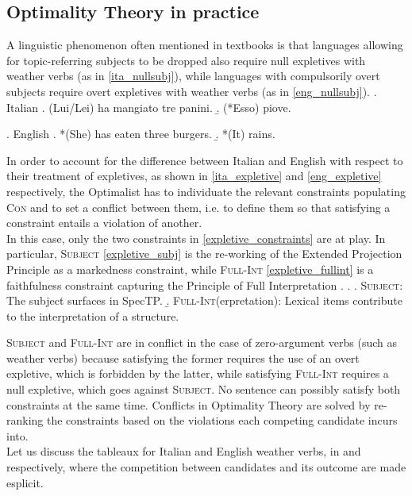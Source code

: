 \subsection{Optimality Theory in practice} A linguistic phenomenon often mentioned in textbooks is that languages allowing for topic-referring subjects to be dropped also require null expletives with weather verbs (as in \ref{ita_nullsubj}), while languages with compulsorily overt subjects require overt expletives with weather verbs (as in \ref{eng_nullsubj}).
\ex. \label{ita_nullsubj} Italian
\a. (Lui/Lei) ha mangiato tre panini.
\b. \label{ita_expletive} (*Esso) piove.

\ex. \label{eng_nullsubj} English
\a. *(She) has eaten three burgers.
\b. \label{eng_expletive} *(It) rains.

In order to account for the difference between Italian and English with respect to their treatment of expletives, as shown in \ref{ita_expletive} and \ref{eng_expletive} respectively, the Optimalist has to individuate the relevant constraints populating \textsc{Con} and to set a conflict between them, i.e. to define them so that satisfying a constraint entails a violation of another.\\
In this case, only the two constraints in \ref{expletive_constraints} are at play. In particular, \textsc{Subject} \ref{expletive_subj} is the re-working of the Extended Projection Principle \parencite{chomsky1982epp} as a markedness constraint, while \textsc{Full-Int} \ref{expletive_fullint} is a faithfulness constraint capturing the Principle of Full Interpretation \parencite{chomsky1991fullint}.
\ex. \label{expletive_constraints} \a. \label{expletive_subj} \textsc{Subject}: The subject surfaces in SpecTP.
\b. \label{expletive_fullint} \textsc{Full-Int}(erpretation): Lexical items contribute to the interpretation of a structure.

\textsc{Subject} and \textsc{Full-Int} are in conflict in the case of zero-argument verbs (such as weather verbs) because satisfying the former requires the use of an overt expletive, which is forbidden by the latter, while satisfying \textsc{Full-Int} requires a null expletive, which goes against \textsc{Subject}. No sentence can possibly satisfy both constraints at the same time. Conflicts in Optimality Theory are solved by re-ranking the constraints based on the violations each competing candidate incurs into.\\
Let us discuss the tableaux for Italian and English weather verbs, in  and  respectively, where the competition between candidates and its outcome are made esplicit.

